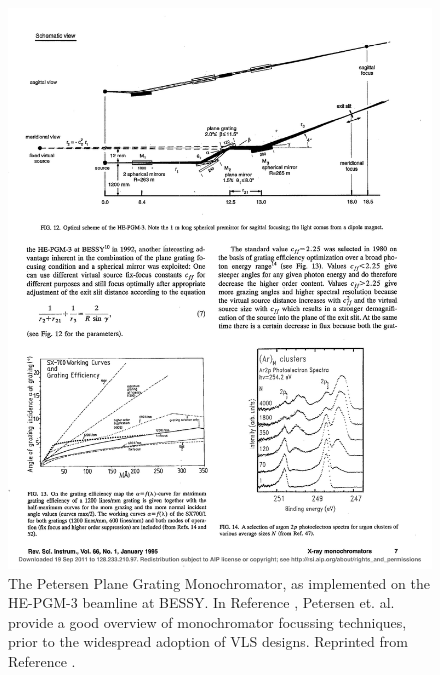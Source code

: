 \begin{figure}[htbp] %
   \centering
  \hspace*{-0.125in} \includegraphics[scale=1]{../data/Chapter1/1c_monoExample/1c_bessy_HE-PGM-3.pdf} 
   \caption[The Petersen Plane Grating Monochromator, as implemented on the HE-PGM-3 beamline at BESSY.]{The Petersen Plane Grating Monochromator, as implemented on the HE-PGM-3 beamline at BESSY.  In Reference \cite{Pet95}, Petersen et. al. provide a good overview of monochromator focussing techniques, prior to the widespread adoption of VLS designs.  Reprinted from Reference \cite{Pet95}.}
   \label{1c}
\end{figure}

